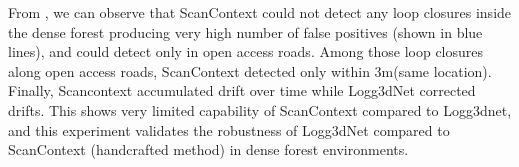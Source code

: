 From , we can observe that ScanContext could not detect any loop closures inside the dense forest producing very high number of false positives (shown in blue lines), and could detect only in open access roads. Among those loop closures along open access roads, ScanContext detected only within 3m(same location). Finally, Scancontext accumulated drift over time while Logg3dNet corrected drifts. This shows very limited capability of ScanContext compared to Logg3dnet, and this experiment validates the robustness of Logg3dNet compared to ScanContext (handcrafted method) in dense forest environments.








